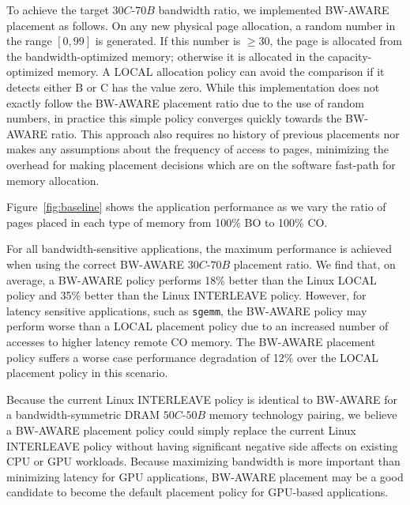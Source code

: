 To achieve the target $30C$-$70B$ bandwidth ratio, we implemented BW-AWARE placement as follows.
On any new physical page allocation, a random number in the range $[0,99]$
is generated.  If this number is $\geq30$, the page is allocated from the bandwidth-optimized memory; 
otherwise it is allocated in the capacity-optimized memory. A LOCAL allocation policy can avoid the
comparison if it detects either B or C has the value zero.  While this implementation does
not exactly follow the BW-AWARE placement ratio due to the use of random numbers, in practice this 
simple policy converges quickly towards the BW-AWARE ratio.  This approach also requires no history
of previous placements {\color{black} nor makes any assumptions about the frequency of access to pages}, 
minimizing the overhead for making placement decisions which are on the 
software fast-path for memory allocation.

Figure~\ref{fig:baseline} shows the application performance as we vary the ratio of pages placed in 
each type of memory from 100\% BO to 100\% CO\@. 
{\color{black}
For all bandwidth-sensitive applications, the maximum performance is
achieved when using the correct BW-AWARE $30C$-$70B$ placement ratio.  We
find that, on average, a BW-AWARE policy performs 18\% better than the Linux
LOCAL policy and 35\% better than the Linux INTERLEAVE policy. However, for latency sensitive
applications, such as {\tt sgemm}, the BW-AWARE policy may perform worse than a LOCAL
placement policy due to an increased number of accesses to higher latency remote
CO memory. The BW-AWARE placement policy suffers a worse case performance degradation of
12\% over the LOCAL placement policy in this scenario.


Because the current Linux INTERLEAVE policy is identical to BW-AWARE for a bandwidth-symmetric
DRAM $50C$-$50B$ memory technology pairing, we believe a BW-AWARE placement policy could simply
replace the current Linux INTERLEAVE policy without having significant negative side
affects on existing CPU or GPU workloads.  Because maximizing bandwidth is more important
than minimizing latency for GPU applications, BW-AWARE placement may be a good candidate
to become the default placement policy for GPU-based applications.}

